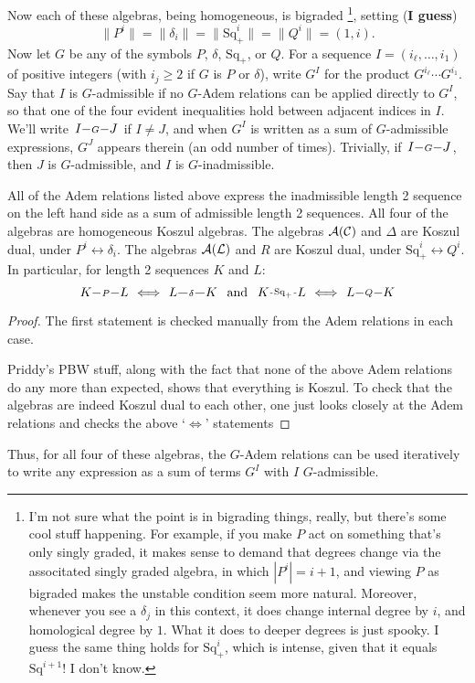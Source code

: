 \documentclass[10pt]{article}
\makeatletter
\newcommand{\produces}[3]{{#1}{#3}{#2}}
\renewcommand{\Q}{Q}
\newcommand{\SqShift}{\Sq_{+}}
\newcommand{\Sq}{\mathrm{Sq}}
\newcommand{\Comm}{\calC}
\newcommand{\LieSteen}{\calA(\calL)}
\newcommand{\CommSteen}{\calA(\Comm)}
\renewcommand{\produces}[3]{
{
\def\labelstyle{\scriptstyle}
\xymatrix@C=2em@1{
{#1}
\ar@{-}[r]|-{{\,#3\,}}
&%
{#2}%
}}}
\makeatother
\begin{document}
\begin{SteenrodAlgebrasAndTheirKoszulDuals}
Now each of these algebras, being homogeneous, is bigraded%
\footnote{I'm not sure what the point is in bigrading things, really, but there's some cool stuff happening. For example, if you make $P$ act on something that's only singly graded, it makes sense to demand that degrees change via the associtated singly graded algebra, in which $|P^i|=i+1$, and viewing $P$ as bigraded makes the unstable condition seem more natural. Moreover, whenever you see a $\delta_j$ in this context, it does change internal degree by $i$, and homological degree by $1$. What it does to deeper degrees is just spooky. I guess the same thing holds for $\SqShift^i$, which is intense, given that it equals $\Sq^{i+1}$! I don't know.}, setting (\textbf{I guess}) 
\[\|P^i\|=\|\delta_i\|=\|\SqShift^i\|=\|\Q^i\|=(1,i).\]
Now let $G$ be any of the symbols $P$, $\delta$, $\SqShift$, or $\Q$. For a sequence $I=(i_{\ell},\ldots,i_1)$ of positive integers (with $i_j\geq2$ if $G$ is $P$ or $\delta$), write $G^I$ for the product $G^{i_\ell}\cdots G^{i_1}$. Say that $I$ is $G$-admissible if no $G$-Adem relations can be applied directly to $G^I$, so that one of the four evident inequalities hold between adjacent indices in $I$. We'll write $\produces{I}{J}{G}$ if $I\neq J$, and when $G^I$ is written as a sum of $G$-admissible expressions, $G^J$ appears therein (an odd number of times). Trivially, if $\produces{I}{J}{G}$, then $J$ is $G$-admissible, and $I$ is $G$-inadmissible.
\begin{lem}
All of the Adem relations listed above express the inadmissible length 2 sequence on the left hand side as a sum of admissible length 2 sequences. All four of the algebras are homogeneous Koszul algebras. The algebras $\CommSteen$ and $\Delta$ are Koszul dual, under $P^i\longleftrightarrow\delta_i$. The algebras $\LieSteen$ and $R$ are Koszul dual, under $\SqShift^i\longleftrightarrow\Q^i$. In particular, for length 2 sequences $K$ and $L$:
\[\produces{K}{L}{P}\iff\produces{L}{K}{\delta}\textup{ \ and \ }\produces{K}{L}{\SqShift}\iff\produces{L}{K}{\Q}\]

\end{lem}
\begin{proof}
The first statement is checked manually from the Adem relations in each case.

Priddy's PBW stuff, along with the fact that none of the above Adem relations do any more than expected, shows that everything is Koszul. To check that the algebras are indeed Koszul dual to each other, one just looks closely at the Adem relations and checks the above `$\iff$' statements
\end{proof}
Thus, for all four of these algebras, the $G$-Adem relations can be used iteratively to write any expression as a sum of terms $G^I$ with $I$ $G$-admissible. 


\end{SteenrodAlgebrasAndTheirKoszulDuals}
\end{document}
